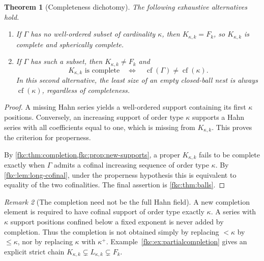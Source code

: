 \documentclass[11pt,letterpaper]{article}
\numberwithin{equation}{section}
\newtheorem{theorem}{Theorem}[section]
\theoremstyle{definition}
\theoremstyle{remark}
\newtheorem{remark}[theorem]{Remark}
\newcommand{\cf}{\operatorname{cf}}
\newcommand{\K}{K_{\kappa,k}}
\begin{document}
\begin{theorem}[Completeness dichotomy]\label{fkc:thm:dichotomy}
The following exhaustive alternatives hold.
\begin{enumerate}[label=\textup{(\roman*)}]
\item If $\Gamma$ has no well-ordered subset of cardinality $\kappa$, then $\K=F_k$, so $\K$ is complete and spherically complete.
\item If $\Gamma$ has such a subset, then $\K\ne F_k$ and
\begin{equation}\label{fkc:eq:complete-dichotomy}
 \boxed{\ \K\text{ is complete}\quad\Longleftrightarrow\quad
          \cf(\Gamma)\ne\cf(\kappa).\ }
\end{equation}
In this second alternative, the least size of an empty closed-ball nest is always $\cf(\kappa)$, regardless of completeness.
\end{enumerate}
\end{theorem}
\begin{proof}
A missing Hahn series yields a well-ordered support containing its first $\kappa$ positions. Conversely, an increasing support of order type $\kappa$ supports a Hahn series with all coefficients equal to one, which is missing from $\K$. This proves the criterion for properness.

By \cref{fkc:thm:completion,fkc:prop:new-supports}, a proper $\K$ fails to be complete exactly when $\Gamma$ admits a cofinal increasing sequence of order type $\kappa$. By \cref{fkc:lem:long-cofinal}, under the properness hypothesis this is equivalent to equality of the two cofinalities. The final assertion is \cref{fkc:thm:balls}.
\end{proof}

\begin{remark}[The completion need not be the full Hahn field]
A new completion element is required to have cofinal support of order type exactly $\kappa$. A series with $\kappa$ support positions confined below a fixed exponent is never added by completion. Thus the completion is not obtained simply by replacing $<\kappa$ by $\le\kappa$, nor by replacing $\kappa$ with $\kappa^+$. Example~\ref{fkc:ex:partialcompletion} gives an explicit strict chain $K_{\kappa,k}\subsetneq L_{\kappa,k}\subsetneq F_k$.
\end{remark}
\end{document}
